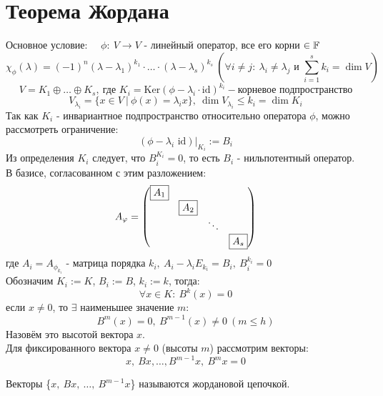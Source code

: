 \section{Теорема Жордана}
    Основное условие: \ \  $\phi: \ V \to V$ - линейный оператор, все его корни $\in \mathbb{F}$
    $$\chi_{\phi}(\lambda) = (-1)^n(\lambda-\lambda_1)^{k_1}\cdot\ldots\cdot(\lambda-\lambda_s)^{k_s} \ (\forall i\neq j: \ \lambda_i\neq\lambda_j \text{ и } \sum \limits_{i=1}^s k_i = \dim V)$$
    $$V = K_1\oplus\ldots\oplus K_s, \ \text{где } K_i = \text{Ker}(\phi-\lambda_i\cdot\text{id})^{k_i} - \text{корневое подпространство}$$
    $$V_{\lambda_i} = \{x\in V \ | \ \phi(x) = \lambda_ix\}, \  \dim V_{\lambda_i}\leqslant k_i = \dim K_i$$
    Так как $K_i$ - инвариантное подпространство относительно оператора $\phi$, можно рассмотреть ограничение: 
    $$(\phi-\lambda_i \text{ id})|_{K_i} := B_i$$
    Из определения $K_i$ следует, что $B_i^{K_i}=0$, то есть $B_i$ - нильпотентный оператор.\\
    В базисе, согласованном с этим разложением: 
    $$A_{\phi} = \begin{pmatrix}
    \text{\fbox{$A_1$}}\\
    \null & \text{\fbox{$A_2$}}\\
    \null & \null & \ddots\\
    \null & \null & \null & \text{\fbox{$A_s$}}
    \end{pmatrix}$$
    где $A_i = A_{\phi_{k_i}}$ - матрица порядка $k_i, \  A_i-\lambda_iE_{k_i} = B_i, \ B_i^{k_i}=0$\\
    Обозначим $K_i :=K$, $B_i :=B$, $k_i :=k$, тогда: 
    $$\forall x\in K: \  B^k(x) = 0$$
    если $x\neq0$, то $\exists$ наименьшее значение $m$: 
    $$B^m(x) = 0, \ B^{m-1}(x)\neq 0 \ (m\leqslant h)$$ 
    Назовём это высотой вектора $x$.\\
    Для фиксированного вектора $x\neq0$ (высоты $m$) рассмотрим векторы: 
    $$x, \  Bx, \ldots,B^{m-1}x, \ B^mx = 0$$
    \begin{definition}
        Векторы \{$x,\ Bx,\ \ldots,\  B^{m-1}x $\} называются жордановой цепочкой.
    \end{definition}  
